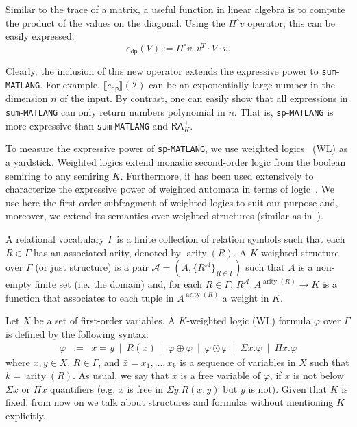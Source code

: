 \documentclass[sigconf]{acmart}
\newcommand{\sem}[2]{\llbracket #1 \rrbracket(#2)}
\newcommand{\I}{\mathcal{I}}
\newcommand{\langsum}{\texttt{sum}-\texttt{MATLANG}\xspace}
\newcommand{\langprod}{\texttt{sp}-\texttt{MATLANG}\xspace}
\newcommand{\ksum}{\oplus}
\newcommand{\kprod}{\odot}
\newcommand{\hadprod}{\circ}
\newcommand{\qhadprod}{\Pi^{\hadprod}}
\newcommand{\cA}{\mathcal{A}}
\newcommand{\arity}{\operatorname{arity}}
\begin{document}
\begin{example}
	Similar to the trace of a matrix, a useful function in linear algebra is to compute the product of the values on the diagonal. 
	Using the $\qhadprod v$ operator, this can be easily expressed:
\begin{equation*}
	 e_{\mathsf{dp}}(V) := \qhadprod v. \ v^T\cdot V \cdot v. \tag*{$\qed$}
\end{equation*}
\end{example}

Clearly, the inclusion of this new operator extends the expressive power to \langsum. For example,  $\sem{e_{\mathsf{dp}}}{\I}$ can be an exponentially large number in the dimension $n$ of the input.
By contrast, one can easily show that all expressions in \langsum can only return numbers polynomial in  $n$. That is, \langprod is more expressive than \langsum and $\mathsf{RA}_{K}^+$. 

To measure the expressive power of \langprod, we use weighted logics~\cite{DrosteG05} (WL) as a yardstick. Weighted logics extend monadic second-order logic from the boolean semiring to any semiring $K$. Furthermore, it has been used extensively to characterize the expressive power of weighted automata in terms of logic~\cite{droste2009handbook}. We use here the first-order subfragment of weighted logics to suit our purpose and, moreover, we extend its semantics over weighted structures (similar as in~\cite{GradelV17}).

A relational vocabulary $\Gamma$ is a finite collection of relation symbols such that each $R \in \Gamma$ has an associated arity, denoted by $\arity(R)$.
A $K$-weighted structure over $\Gamma$ (or just structure) is a pair $\cA = (A, \{R^\cA\}_{R \in \Gamma})$ such that $A$ is a non-empty finite set (i.e. the domain) and, for each $R \in \Gamma$, $R^\cA: A^{\arity(R)} \rightarrow K$ is a function that associates to each tuple in $A^{\arity(R)}$ a weight in $K$.

Let $X$ be a set of first-order variables. A $K$-weighted logic (WL) formula $\varphi$ over $\Gamma$ is defined by the following syntax:
$$
\begin{array}{rcl}
\varphi & := & x = y \ \mid \ R(\bar{x}) \ \mid \ \varphi \ksum \varphi \ \mid \ \varphi \kprod \varphi \ \mid \ \Sigma x. \varphi \ \mid \ \Pi x. \varphi
\end{array}
$$ 
where $x, y \in X$, $R \in \Gamma$, and $\bar{x} = x_1, \ldots, x_k$ is a sequence of variables in $X$ such that $k=\arity(R)$. As usual, we say that $x$ is a free variable of $\varphi$, if $x$ is not below $\Sigma x$ or $\Pi x$ quantifiers (e.g. $x$ is free in $\Sigma y. R(x,y)$ but $y$ is not). 
Given that $K$ is fixed, from now on we talk about structures and formulas without mentioning $K$ explicitly.  
\end{document}
